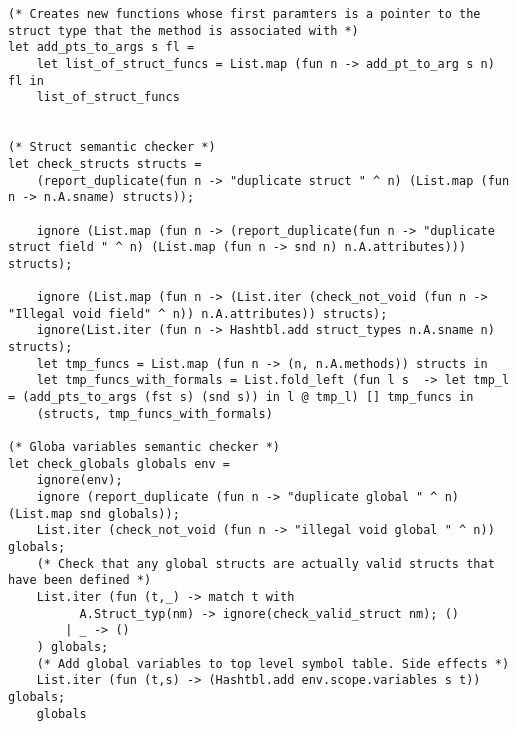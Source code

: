 \documentclass{article}
\begin{document}
\begin{lstlisting}
(* Creates new functions whose first paramters is a pointer to the struct type that the method is associated with *)
let add_pts_to_args s fl = 
	let list_of_struct_funcs = List.map (fun n -> add_pt_to_arg s n) fl in	
	list_of_struct_funcs
	

(* Struct semantic checker *)
let check_structs structs = 
	(report_duplicate(fun n -> "duplicate struct " ^ n) (List.map (fun n -> n.A.sname) structs)); 

	ignore (List.map (fun n -> (report_duplicate(fun n -> "duplicate struct field " ^ n) (List.map (fun n -> snd n) n.A.attributes))) structs);

	ignore (List.map (fun n -> (List.iter (check_not_void (fun n -> "Illegal void field" ^ n)) n.A.attributes)) structs);
	ignore(List.iter (fun n -> Hashtbl.add struct_types n.A.sname n) structs);
	let tmp_funcs = List.map (fun n -> (n, n.A.methods)) structs in
	let tmp_funcs_with_formals = List.fold_left (fun l s  -> let tmp_l = (add_pts_to_args (fst s) (snd s)) in l @ tmp_l) [] tmp_funcs in
	(structs, tmp_funcs_with_formals)

(* Globa variables semantic checker *)
let check_globals globals env = 
	ignore(env);
	ignore (report_duplicate (fun n -> "duplicate global " ^ n) (List.map snd globals)); 
	List.iter (check_not_void (fun n -> "illegal void global " ^ n)) globals;
	(* Check that any global structs are actually valid structs that have been defined *)
	List.iter (fun (t,_) -> match t with 
		  A.Struct_typ(nm) -> ignore(check_valid_struct nm); ()
		| _ -> ()
	) globals;
	(* Add global variables to top level symbol table. Side effects *)
	List.iter (fun (t,s) -> (Hashtbl.add env.scope.variables s t)) globals;
	globals


\end{lstlisting}
\end{document}
